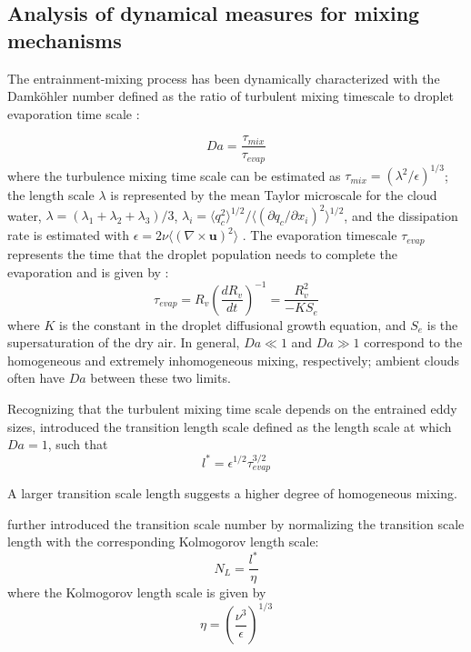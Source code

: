 \documentclass[draft,linenumbers]{agujournal}
\begin{document}
\subsection{Analysis of dynamical measures for mixing mechanisms}
The entrainment-mixing process has been dynamically characterized with the Damk{\"o}hler number defined as the ratio of 
turbulent mixing timescale to droplet evaporation time scale
\citep{Baker1980, Krueger1997Modeling, Grabowski1993Cumulus}:

\begin{equation}
Da=\frac{\tau_{mix}}{\tau_{evap}}\label{eq:DaNumber}
\end{equation}
where the turbulence mixing time scale can be estimated as $\tau_{mix} = (\lambda^2/\epsilon)^{1/3}$; the length scale $\lambda$ is represented by the mean Taylor microscale for the cloud water, $\lambda = 
(\lambda_1+\lambda_2+\lambda_3)/3$, $\lambda_i = \langle q_c^2\rangle^{1/2}/\langle(\partial q_c/\partial x_i)^2\rangle^{1/2}$, and the dissipation rate is estimated with $\epsilon = 2\nu\langle(\nabla\times \mathbf{u})^2\rangle$ \citep{And09}. The evaporation timescale $\tau_{evap}$ represents the time that the 
droplet population needs to complete the evaporation and is given by 
\citet{And09, Burnet2007Observational}:
\begin{equation}
\tau_{evap} = R_v(\frac{dR_v}{dt})^{-1} = \frac{R_v^2}{-KS_e}
\end{equation}
where $K$ is the constant in the droplet diffusional growth equation, and $S_e$ is the supersaturation of the dry air. In general, $Da \ll 1$ and $Da \gg 1$ correspond to the homogeneous and extremely inhomogeneous mixing, respectively; ambient clouds often have $Da$ between these two limits.

Recognizing that the turbulent mixing time scale depends on the entrained eddy sizes, \citet{Lehmann2009} introduced the transition length scale defined as the length scale at which $Da = 1$, such that
\begin{equation}
l^{*}=\epsilon^{1/2}\tau_{evap}^{3/2}
\end{equation}

A larger transition scale length suggests a higher degree of homogeneous mixing.
 
\citet{Lu2011} further introduced the transition scale number by normalizing the transition scale length with the corresponding Kolmogorov length scale:
\begin{equation}
N_{L}=\frac{l^{*}}{\eta}\label{eq:NL}
\end{equation}
where the Kolmogorov length scale is given by
\begin{equation}
\eta = (\frac{\nu^3}{\epsilon})^{1/3}
\end{equation}
\end{document}
